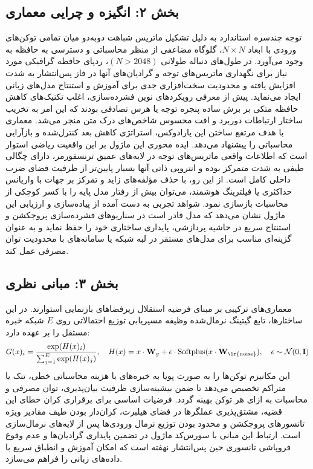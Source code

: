 \subsection*{بخش ۲: انگیزه و چرایی معماری }
توجه چندسره استاندارد  به دلیل تشکیل ماتریس شباهت دو‌به‌دو میان تمامی توکن‌های ورودی با ابعاد $N \times N$، گلوگاه مضاعفی از منظر محاسباتی و دسترسی به حافظه به وجود می‌آورد. در طول‌های دنباله طولانی $(N > 2048)$، ردپای حافظه گرافیکی مورد نیاز برای نگهداری ماتریس‌های توجه و گرادیان‌های آنها در فاز پس‌انتشار به شدت افزایش یافته و محدودیت سخت‌افزاری جدی برای آموزش و استنتاج مدل‌های زبانی ایجاد می‌نماید.
پیش از معرفی رویکردهای نوین فشرده‌سازی، اغلب تکنیک‌های کاهش حافظه متکی بر برش ساده پنجره توجه  یا هرس تصادفی بودند که این امر به تخریب ساختار ارتباطات دوربرد و افت محسوس شاخص‌های درک متن منجر می‌شد. معماری  با هدف مرتفع ساختن این پارادوکس، استراتژی کاهش بعد کنترل‌شده و بازآرایی محاسباتی را پیشنهاد می‌دهد.
ایده محوری این ماژول بر این واقعیت ریاضی استوار است که اطلاعات واقعی ماتریس‌های توجه در لایه‌های عمیق ترنسفورمر، دارای چگالی طیفی به شدت متمرکز بوده و انتروپی ذاتی آنها بسیار پایین‌تر از ظرفیت فضای ضرب داخلی کامل است. از این رو، با حذف مؤلفه‌های زاید و تمرکز بر جهات با واریانس حداکثری یا فیلترینگ هوشمند، می‌توان بیش از  رفتار مدل پایه را با کسر کوچکی از محاسبات بازسازی نمود.
شواهد تجربی به دست آمده از پیاده‌سازی و ارزیابی این ماژول نشان می‌دهد که مدل قادر است در سناریوهای فشرده‌سازی پروجکشن و استنتاج سریع در حاشیه پردازشی، پایداری ساختاری خود را حفظ نماید و به عنوان گزینه‌ای مناسب برای مدل‌های مستقر در لبه شبکه یا سامانه‌های با محدودیت توان مصرفی عمل کند.

\subsection*{بخش ۳: مبانی نظری }
معماری‌های ترکیبی بر مبنای فرضیه استقلال زیرفضاهای بازنمایی استوارند. در این ساختارها، تابع گیتینگ نرمال‌شده وظیفه مسیریابی توزیع احتمالاتی روی $E$ شبکه خبره مستقل را بر عهده دارد:
$$G(x)_i = \frac{\exp(H(x)_i)}{\sum_{j=1}^E \exp(H(x)_j)}, \quad H(x) = x \cdot \mathbf{W}_g + \epsilon \cdot \operatorname{Softplus}(x \cdot \mathbf{W}_{\text{\lr{noise}}}), \quad \epsilon \sim \mathcal{N}(0, \mathbf{I})$$
این مکانیزم توکن‌ها را به صورت پویا به خبره‌های با هزینه محاسباتی خطی، تنک یا متراکم تخصیص می‌دهد تا ضمن بیشینه‌سازی ظرفیت بیان‌پذیری، توان مصرفی و محاسبات به ازای هر توکن بهینه گردد.
فرضیات اساسی برای برقراری کران خطای این قضیه، مشتق‌پذیری عملگرها در فضای هیلبرت، کران‌دار بودن طیف مقادیر ویژه تانسورهای پروجکشن و محدود بودن توزیع نرمال ورودی‌ها پس از لایه‌های نرمال‌سازی  است.
ارتباط این مبانی با سورس‌کد ماژول  در تضمین پایداری گرادیان‌ها و عدم وقوع فروپاشی تانسوری حین پس‌انتشار نهفته است که امکان آموزش و انطباق سریع با داده‌های زبانی را فراهم می‌سازد.

